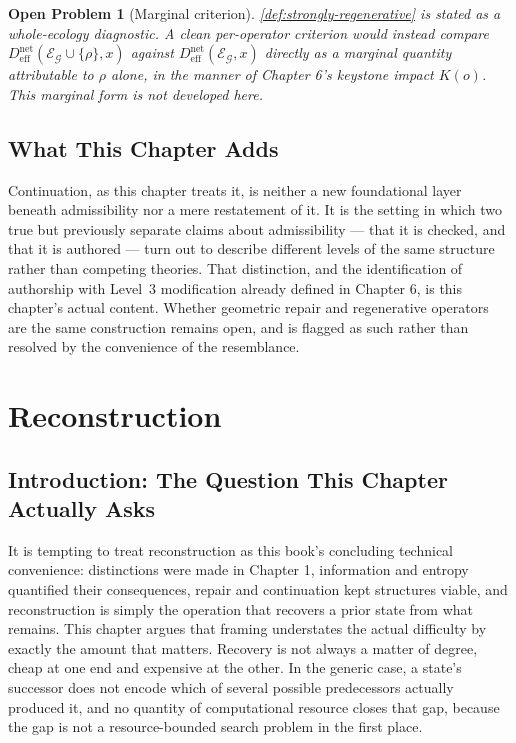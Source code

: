 \documentclass[12pt]{report}
\newtheorem{openproblem}[definition]{Open Problem}
\begin{document}
\begin{openproblem}[Marginal criterion]
\label{prob:marginal}
\cref{def:strongly-regenerative} is stated as a whole-ecology
diagnostic. A clean per-operator criterion would instead compare
$D_{\mathrm{eff}}^{\mathrm{net}}(\mathcal{E}_\mathcal{G} \cup \{\rho\},x)$
against $D_{\mathrm{eff}}^{\mathrm{net}}(\mathcal{E}_\mathcal{G},x)$
directly as a marginal quantity attributable to $\rho$ alone, in the
manner of Chapter 6's keystone impact $K(o)$. This marginal form is not
developed here.
\end{openproblem}

\section*{What This Chapter Adds}

Continuation, as this chapter treats it, is neither a new foundational
layer beneath admissibility nor a mere restatement of it. It is the
setting in which two true but previously separate claims about
admissibility --- that it is checked, and that it is authored --- turn
out to describe different levels of the same structure rather than
competing theories. That distinction, and the identification of
authorship with Level~3 modification already defined in Chapter 6, is
this chapter's actual content. Whether geometric repair and regenerative
operators are the same construction remains open, and is flagged as such
rather than resolved by the convenience of the resemblance.

\chapter{Reconstruction}

\section{Introduction: The Question This Chapter Actually Asks}

It is tempting to treat reconstruction as this book's concluding
technical convenience: distinctions were made in Chapter 1, information
and entropy quantified their consequences, repair and continuation kept
structures viable, and reconstruction is simply the operation that
recovers a prior state from what remains. This chapter argues that
framing understates the actual difficulty by exactly the amount that
matters. Recovery is not always a matter of degree, cheap at one end and
expensive at the other. In the generic case, a state's successor does
not encode which of several possible predecessors actually produced it,
and no quantity of computational resource closes that gap, because the
gap is not a resource-bounded search problem in the first place.
\end{document}
